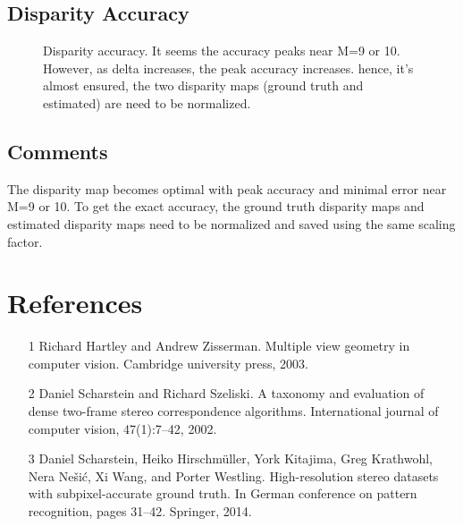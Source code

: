 \documentclass{article}
\begin{document}
\newpage
\subsection{Disparity Accuracy}
\begin{figure}[!htbp]
     \centering
     \captionsetup[subfigure]{labelformat=empty}
    \caption{Disparity accuracy. It seems the accuracy peaks near M=9 or 10. However, as delta increases, the peak accuracy increases. hence, it's almost ensured, the two disparity maps (ground truth and estimated) are need to be normalized.}
    \label{fig:disp_acc}
\end{figure}
\subsection*{Comments}
The disparity map becomes optimal with peak accuracy and minimal error near M=9 or 10. To get the exact accuracy, the ground truth disparity maps and estimated disparity maps need to be normalized and saved using the same scaling factor.



\newpage
\section{References}
\begin{itemize}
\item[1] Richard Hartley and Andrew Zisserman. Multiple view geometry in computer vision. Cambridge university press, 2003.
\item[2] Daniel Scharstein and Richard Szeliski. A taxonomy and evaluation of
dense two-frame stereo correspondence algorithms. International journal
of computer vision, 47(1):7–42, 2002.
\item[3] Daniel Scharstein, Heiko Hirschmüller, York Kitajima, Greg Krathwohl,
Nera Nešić, Xi Wang, and Porter Westling. High-resolution stereo
datasets with subpixel-accurate ground truth. In German conference
on pattern recognition, pages 31–42. Springer, 2014.
\end{itemize}
\end{document}
